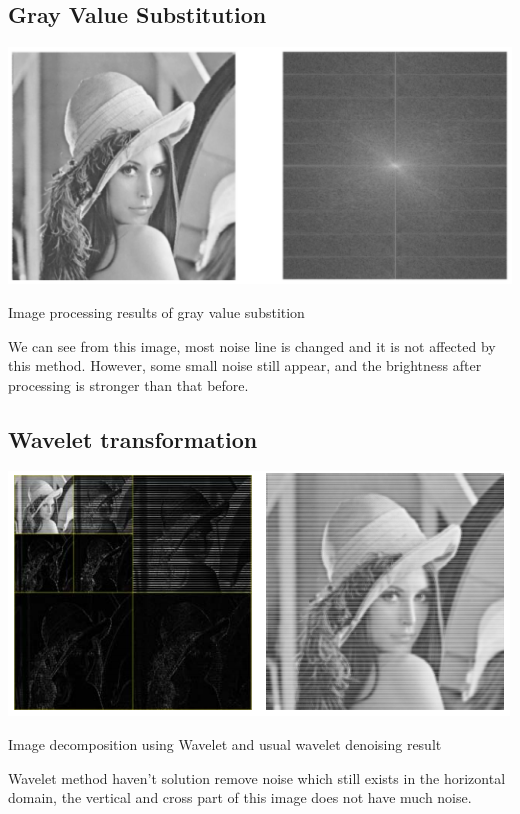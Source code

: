 \subsection{Gray Value Substitution }
\begin{center}
\includegraphics{gray.png}

 Image processing results of gray value substition 
\end{center}

We can see from this image, most noise line is changed and it is not affected by this method.  However, some small noise still appear, and the brightness after processing is stronger than that before. 

\subsection{Wavelet transformation }

\begin{center}
\includegraphics{wave.png}

Image decomposition using Wavelet and usual wavelet denoising result
\end{center}
Wavelet method  haven't solution remove noise which still exists in the horizontal domain, the vertical and cross part of this image does not have much noise. 

